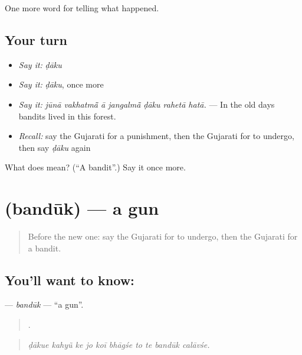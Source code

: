 \begin{grammarlens}[title={What you've built}]
One more word for telling what happened.
\end{grammarlens}

\subsection*{Your turn}
\begin{itemize}
\raggedright
  \item \emph{Say it:} \emph{ḍāku}
  \item \emph{Say it:} \emph{ḍāku}, once more
  \item \emph{Say it:} \emph{jūnā vakhatmā̃ ā jangalmā̃ ḍāku rahetā hatā.} — In the old days bandits lived in this forest.
  \item \emph{Recall:} say the Gujarati for a punishment, then the Gujarati for to undergo, then say \emph{ḍāku} again
\end{itemize}

\begin{tcolorbox}[breakable,colback=teal!4,colframe=teal!35!black,title={Before you move on}]
What does  mean? (\textquotedblleft{}A bandit\textquotedblright{}.) Say it once more.
\end{tcolorbox}
\section[\texorpdfstring{\gu{બંદૂક} (bandūk)}{બંદૂક (bandūk)}]{ (bandūk) — a gun}

\label{lesson:GU-C290-banduk}



\begin{quote}
Before the new one: say the Gujarati for to undergo, then the Gujarati for a bandit.
\end{quote}

\subsection*{You'll want to know: }
\textbf{} — \emph{bandūk} — \textquotedblleft{}a gun\textquotedblright{}.

\begin{quote}
         .
\end{quote}

\begin{quote}
\emph{ḍākue kahyũ ke jo koī bhāgśe to te bandūk calāvśe.}
\end{quote}

